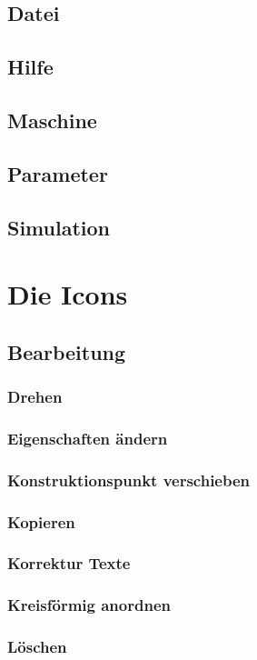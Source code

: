 \documentclass[a4paper]{book}
\begin{document}
		\subsection{Datei}
		\subsection{Hilfe}
		\subsection{Maschine}
		\subsection{Parameter}
		\subsection{Simulation}
	\section{Die Icons}
		\subsection{Bearbeitung}
			\subsubsection{Drehen}
			\subsubsection{Eigenschaften ändern}
			\subsubsection{Konstruktionspunkt verschieben}
			\subsubsection{Kopieren}
			\subsubsection{Korrektur Texte}
			\subsubsection{Kreisförmig anordnen}
			\subsubsection{Löschen}
\end{document}
